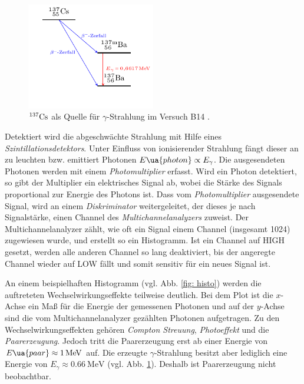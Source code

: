 \begin{figure}[h]
  \centering
  \includegraphics[width=0.5\textwidth]{pics/tikz-Energieschema.pdf}
  \caption{$^{137}\ce{Cs}$ als Quelle für $\gamma$-Strahlung im Versuch B14 \cite{luckyjosh}.}
  \label{fig: zerfall}
\end{figure}

Detektiert wird die abgeschwächte Strahlung mit Hilfe eines \emph{Szintillationsdetektors}.
Unter Einfluss von ionisierender Strahlung fängt dieser an zu leuchten bzw. emittiert Photonen $E\ua{photon}\propto E_\gamma$.
Die ausgesendeten Photonen werden mit einem \emph{Photomultiplier} erfasst. Wird ein Photon detektiert,
so gibt der Multiplier ein elektrisches Signal ab, wobei die Stärke des Signals proportional zur Energie des Photons ist.
Dass vom \emph{Photomultiplier} ausgesendete Signal,
wird an einem \emph{Diskriminator} weitergeleitet, der dieses je nach Signalstärke, einen Channel des %
\emph{Multichannelanalyzers} zuweist. Der Multichannelanalyzer zählt, wie oft ein Signal einem Channel (insgesamt 1024) zugewiesen wurde, und %
erstellt so ein Histogramm. Ist ein Channel auf HIGH gesetzt, werden alle anderen Channel so lang deaktiviert,
bis der angeregte Channel wieder auf LOW fällt und somit sensitiv für ein neues Signal ist.

An einem beispielhaften Histogramm (vgl. Abb. \ref{fig: histo}) werden die auftreteten Wechselwirkungseffekte teilweise deutlich.
Bei dem Plot ist die $x$-Achse ein Maß für die Energie der gemessenen Photonen und auf der $y$-Achse sind die vom Multichannelanalyzer %
gezählten Photonen aufgetragen. %
Zu den Wechselwirkungseffekten gehören \emph{Compton Streuung}, \emph{Photoeffekt} und die \emph{Paarerzeugung}. %
Jedoch tritt die Paarerzeugung erst ab einer Energie von $E\ua{paar}\approx \SI{1}{\mega\eV}$ auf. Die erzeugte $\gamma$-Strahlung %
besitzt aber lediglich eine Energie von $E_{\gamma}\approx\SI{0.66}{\mega\eV}$ (vgl. Abb. \ref{fig: zerfall}).
Deshalb ist Paarerzeugung nicht beobachtbar.

